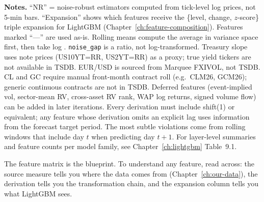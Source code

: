 \noindent
\textbf{Notes.}\enspace
``NR'' = noise-robust estimators computed from tick-level log prices, not 5-min bars.
``Expansion'' shows which features receive the \{level, change, $z$-score\} triple expansion for LightGBM (Chapter~\ref{ch:feature-composition}).
Features marked ``---'' are used as-is.
Rolling means compute the average in variance space first, then take log \citep{Corsi2009}.
\texttt{noise\_gap} is a ratio, not log-transformed.
Treasury slope uses note prices (US10YT=RR, US2YT=RR) as a proxy; true yield tickers are not available in TSDB.
EUR/USD is sourced from Marquee FXIVOL, not TSDB.
CL and GC require manual front-month contract roll (e.g.\ CLM26, GCM26); generic continuous contracts are not in TSDB.
Deferred features (event-implied vol, sector-mean RV, cross-asset RV rank, WAP log returns, signed volume flow) can be added in later iterations.
Every derivation must include shift(1) or equivalent; any feature whose derivation omits an explicit lag uses information from the forecast target period.
The most subtle violations come from rolling windows that include day $t$ when predicting day $t{+}1$.
For layer-level summaries and feature counts per model family, see Chapter~\ref{ch:lightgbm} Table~9.1.



\begin{keyidea}
The feature matrix is the blueprint.
To understand any feature, read across: the source measure tells you where the data comes from (Chapter~\ref{ch:our-data}), the derivation tells you the transformation chain, and the expansion column tells you what LightGBM sees.
\end{keyidea}

